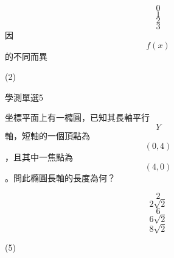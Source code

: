\begin{QUESTIONS}
\begin{QUESTION}
\begin{QBODY}
            \begin{QOPS} 
 \QOP\[0\]	
            \QOP\[1\]	
            \QOP\[2\]
            \QOP\[3\]	
            \QOP 因\[f\left( x \right)\]的不同而異
            \end{QOPS}            
        \end{QBODY}
        \begin{QFROMS}
        \end{QFROMS}
        \begin{QTAGS}\end{QTAGS}
        \begin{QANS}
            (2)
        \end{QANS}
        \begin{QSOLLIST}
        \end{QSOLLIST}
        \begin{QEMPTYSPACE}
        \end{QEMPTYSPACE}
    \end{QUESTION}
    \begin{QUESTION}
        \begin{ExamInfo}{85}{學測}{單選}{5}
        \end{ExamInfo}
        \begin{ExamAnsRateInfo}{}{}{}{}
        \end{ExamAnsRateInfo}
        \begin{QBODY}
            	坐標平面上有一橢圓，已知其長軸平行\[Y\]軸，短軸的一個頂點為\[\left( 0,4 \right)\]，且其中一焦點為\[\left( 4,0 \right)\]。問此橢圓長軸的長度為何？
            \begin{QOPS} 
 \QOP\[2\]	
            \QOP\[2\sqrt{2}\]	
            \QOP\[6\]
            \QOP\[6\sqrt{2}\]	
            \QOP\[8\sqrt{2}\]
            \end{QOPS}            
        \end{QBODY}
        \begin{QFROMS}
        \end{QFROMS}
        \begin{QTAGS}\end{QTAGS}
        \begin{QANS}
            (5)
        \end{QANS}
        \begin{QSOLLIST}
        \end{QSOLLIST}
        \begin{QEMPTYSPACE}
        \end{QEMPTYSPACE}
    \end{QUESTION}

\end{QUESTIONS}
